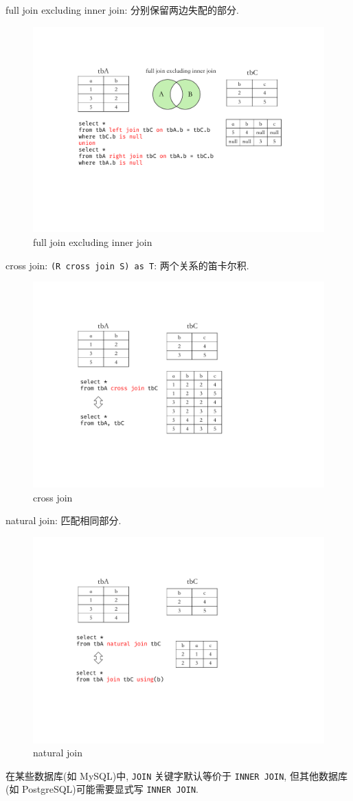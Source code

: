 full join excluding inner join: 分别保留两边失配的部分.

\begin{figure}[H]
    \centering
    \includegraphics[width=.55\textwidth]{figure/full_join_ex.pdf}
    \caption{full join excluding inner join}
\end{figure}

cross join: \verb|(R cross join S) as T|: 两个关系的笛卡尔积.

\begin{figure}[H]
    \centering
    \includegraphics[width=.5\textwidth]{figure/cross_join.pdf}
    \caption{cross join}
\end{figure}

natural join: 匹配相同部分.

\begin{figure}[H]
    \centering
    \includegraphics[width=.5\textwidth]{figure/natural_join.pdf}
    \caption{natural join}
\end{figure}

在某些数据库(如 MySQL)中, \verb|JOIN| 关键字默认等价于 \verb|INNER JOIN|, 但其他数据库(如 PostgreSQL)可能需要显式写 \verb|INNER JOIN|.

